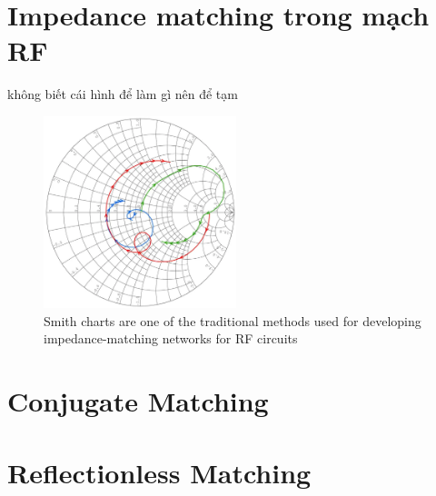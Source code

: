     \section{Impedance matching trong mạch RF}
        không biết cái hình để làm gì nên để tạm\cite{cadence_impedance}
        \begin{figure}[h]
            \centering
            \includegraphics[width=0.5\textwidth]{figures/smith_chart.png}
            \caption{Smith charts are one of the traditional methods used for developing impedance-matching networks for RF circuits}
            \label{fig:smith_chart}
        \end{figure}

    \section{Conjugate Matching}
    \section{Reflectionless Matching}
    \cite{cadence2021conjugatematching}